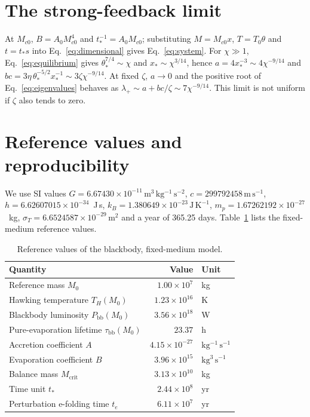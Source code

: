 \documentclass[11pt,a4paper]{article}
\newcommand{\Pbb}{P_{\mathrm{bb}}}
\newcommand{\Mcrit}{M_{\mathrm{crit}}}
\newcommand{\Mc}{M_{c0}}
\newcommand{\tstar}{t_*}
\newcommand{\taubb}{\tau_{\mathrm{bb}}}
\begin{document}
\section{The strong-feedback limit}\label{app:scaling}
At $\Mc$, $B=A_0\Mc^4$ and $\tstar^{-1}=A_0\Mc$; substituting $M=\Mc x$, $T=T_0\theta$ and $t=\tstar s$ into Eq.~\eqref{eq:dimensional} gives Eq.~\eqref{eq:system}. For $\chi\gg1$, Eq.~\eqref{eq:equilibrium} gives $\theta_*^{7/4}\sim\chi$ and $x_*\sim\chi^{3/14}$, hence $a=4x_*^{-3}\sim4\chi^{-9/14}$ and $bc=3\eta\,\theta_*^{-5/2}x_*^{-1}\sim3\zeta\chi^{-9/14}$. At fixed $\zeta$, $a\to0$ and the positive root of Eq.~\eqref{eq:eigenvalues} behaves as $\lambda_+\sim a+bc/\zeta\sim7\chi^{-9/14}$. This limit is not uniform if $\zeta$ also tends to zero.

\section{Reference values and reproducibility}\label{app:values}
We use SI values $G=6.67430\times10^{-11}\,\mathrm{m^3\,kg^{-1}\,s^{-2}}$, $c=299792458\,\mathrm{m\,s^{-1}}$, $h=6.62607015\times10^{-34}$~J\,s, $k_B=1.380649\times10^{-23}\,\mathrm{J\,K^{-1}}$, $m_p=1.67262192\times10^{-27}$~kg, $\sigma_T=6.6524587\times10^{-29}\,\mathrm{m^2}$ and a year of 365.25 days. Table~\ref{tab:values} lists the fixed-medium reference values.

\begin{table}[htbp]
\centering\small
\caption{Reference values of the blackbody, fixed-medium model.}
\label{tab:values}
\begin{tabular}{@{}lrl@{}}
\toprule
Quantity & Value & Unit\\
\midrule
Reference mass $M_0$ & $1.00\times10^7$ & kg\\
Hawking temperature $T_H(M_0)$ & $1.23\times10^{16}$ & K\\
Blackbody luminosity $\Pbb(M_0)$ & $3.56\times10^{18}$ & W\\
Pure-evaporation lifetime $\taubb(M_0)$ & $23.37$ & h\\
Accretion coefficient $A$ & $4.15\times10^{-27}$ & $\mathrm{kg^{-1}\,s^{-1}}$\\
Evaporation coefficient $B$ & $3.96\times10^{15}$ & $\mathrm{kg^3\,s^{-1}}$\\
Balance mass $\Mcrit$ & $3.13\times10^{10}$ & kg\\
Time unit $\tstar$ & $2.44\times10^8$ & yr\\
Perturbation e-folding time $t_e$ & $6.11\times10^7$ & yr\\
\bottomrule
\end{tabular}
\end{table}
\end{document}

